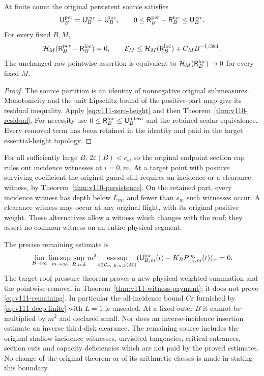 \begin{corollary}
\label{cor:v111-residual}
At finite count the original persistent source satisfies
\begin{equation}\label{eq:v111-exact-preservation}
 \mathsf U_B^{\rm per}=\mathsf U_B^{\rm exc}+\mathsf U_B^{\rm loc},\qquad
 0\le\mathsf R_B^{\rm per}-\mathsf R_B^{\rm loc}\le\mathsf U_B^{\rm exc}.
\end{equation}
For every fixed $B,M$,
\begin{equation}\label{eq:v111-residual-height}
 \mathcal H_M(\mathsf R_B^{\rm per}-\mathsf R_B^{\rm loc})=0,
 \qquad
 \mathcal E_M\le\mathcal H_M(\mathsf R_B^{\rm loc})+C_MB^{-1/384}.
\end{equation}
The unchanged raw pointwise assertion is equivalent to
$\mathcal H_M(\mathsf R_B^{\rm loc})\to0$ for every fixed $M$.
\end{corollary}
\begin{proof}
The source partition is an identity of nonnegative original
submeasures. Monotonicity and the unit Lipschitz bound of the
positive-part map give its residual inequality. Apply
\eqref{eq:v111-zero-height} and then
Theorem~\ref{thm:v110-residual}. For necessity use
$0\le\mathsf R_B^{\rm loc}\le\mathsf U_B^{\rm micro}$ and the
retained scalar equivalence. Every removed term has been retained
in the identity and paid in the target essential-height topology.
\end{proof}

For all sufficiently large $B$, $2\varepsilon(B)<c_\circ$, so the
original endpoint section cap rules out incidence witnesses at
$i=0,m$. At a target point with positive surviving coefficient the
original guard still requires an incidence or a clearance witness,
by Theorem~\ref{thm:v110-persistence}. On the retained part, every
incidence witness has depth below $L_m$, and fewer than $s_m$ such
witnesses occur. A clearance witness may occur at any original
flight, with its original positive weight. These alternatives allow
a witness which changes with the roof; they assert no common witness
on an entire physical segment.

The precise remaining estimate is
\begin{equation}\label{eq:v111-remaining}
 \lim_{B\to\infty}\limsup_{m\to\infty}\sup_{R,n,k}m^2
 \operatorname*{ess\,sup}_{t\in\mathcal C_{m,R,n,k}(M)}
       (\mathsf U_{B,m}^{\rm loc}(t)-K_BP_{r_B,m}^{\rm ng}(t))_+=0.
\end{equation}
The target-roof pressure theorem proves a new physical weighted
summation and the pointwise removal in
Theorem~\ref{thm:v111-witness-payment}; it does not prove
\eqref{eq:v111-remaining}. In particular the all-incidence bound
$C\varepsilon$ furnished by \eqref{eq:v111-deep-finite} with $L=1$
is unscaled. At a fixed outer $B$ it cannot be multiplied by $m^2$
and declared small. Nor does an inverse-incidence insertion estimate
an inverse third-disk clearance. The remaining source includes the
original shallow incidence witnesses, unvisited tangencies, critical
entrances, section cuts and capacity deficiencies which are not paid
by the proved estimates. No change of the original theorem or of its
arithmetic classes is made in stating this boundary.
